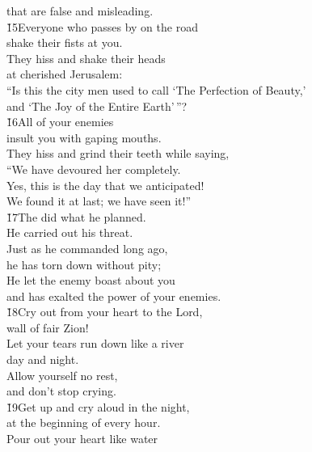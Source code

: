 \begin{poetry}
\poemll    that are false and misleading. \\
\poeml \v{15}Everyone who passes by on the road \\
\poemll    shake their fists at you. \\
\poeml They hiss and shake their heads \\
\poemll    at cherished Jerusalem: \\
\poeml ``Is this the city men used to call `The Perfection of Beauty,' \\
\poemll    and `The Joy of the Entire Earth'\,''? \\
\poeml \v{16}All of your enemies \\
\poemll    insult you with gaping mouths. \\
\poeml They hiss and grind their teeth while saying, \\
\poemll    ``We have devoured her completely. \\
\poeml Yes, this is the day that we anticipated! \\
\poemll    We found it at last; we have seen it!'' \\
\poeml \v{17}The  did what he planned. \\
\poemll    He carried out his threat. \\
\poeml Just as he commanded long ago, \\
\poemll    he has torn down without pity; \\
\poeml He let the enemy boast about you \\
\poemll    and has exalted the power of your enemies. \\
\poeml \v{18}Cry out from your heart to the Lord, \\
\poemll    wall of fair Zion! \\
\poeml Let your tears run down like a river \\
\poemll    day and night. \\
\poeml Allow yourself no rest, \\
\poemll    and don't stop crying. \\
\poeml \v{19}Get up and cry aloud in the night, \\
\poemll    at the beginning of every hour. \\
\poeml Pour out your heart like water \\

\end{poetry}
